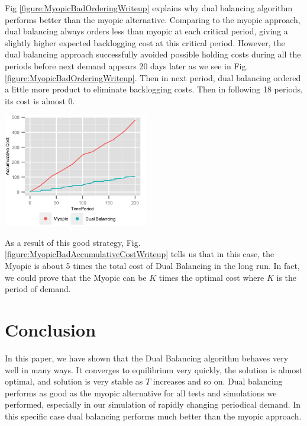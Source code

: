 \documentclass[twoside]{article}
\begin{document}
\begin{multicols}{2}
\begin{center}
  \end{center}
  Fig \ref{figure:MyopicBadOrderingWriteup} explains why dual balancing algorithm performs better than the myopic alternative. Comparing to the myopic approach, dual balancing always orders less than myopic at each critical period, giving a slightly higher expected backlogging cost at this critical period. However, the dual balancing approach successfully avoided possible holding costs during all the periods before next demand appears 20 days later as we see in Fig. \ref{figure:MyopicBadOrderingWriteup}. Then in next period, dual balancing ordered a little more product to eliminate backlogging costs. Then in following 18 periods, its cost is almost 0.
  \begin{center}
    \label{figure:MyopicBadAccumulativeCostWriteup}
    \includegraphics[width=2.5in]{figures/MyopicBadAccumulativeCostWriteup.png}
  \end{center}
  As a result of this good strategy, Fig. \ref{figure:MyopicBadAccumulativeCostWriteup} tells us that in this case, the Myopic is about 5 times the total cost of Dual Balancing in the long run. In fact, we could prove that the Myopic can be $K$ times the optimal cost where $K$ is the period of demand.

\section{Conclusion}

In this paper, we have shown that the Dual Balancing algorithm behaves very well in many ways. It converges to equilibrium very quickly, the solution is almost optimal, and solution is very stable as $T$ increases and so on. Dual balancing performs as good as the myopic alternative for all tests and simulations we performed, especially in our simulation of rapidly changing periodical demand. In this specific case dual balancing performs much better than the myopic approach.\\


\end{multicols}
\end{document}
